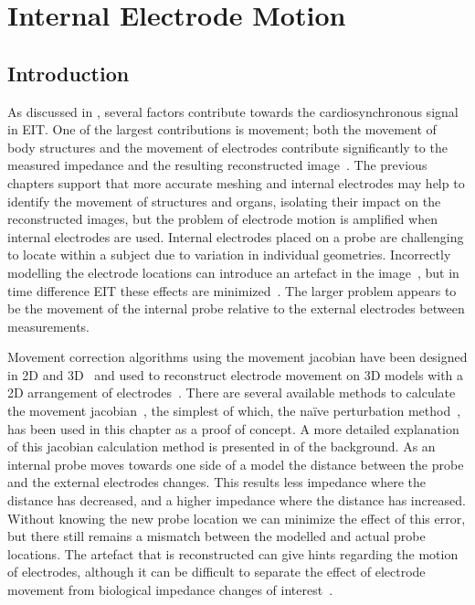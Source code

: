 \chapter{Internal Electrode Motion}
\label{chap:chapter-7}
\section{Introduction}
As discussed in , several factors contribute towards
the cardiosynchronous signal in EIT. One of the largest contributions 
is movement; both the movement of 
body structures and the movement of electrodes contribute significantly to the measured
impedance and the resulting reconstructed 
image~\parencite{adler_origins_2017,proenca_influence_2015}.
The previous chapters support that more accurate meshing and internal electrodes may
help to identify the movement of structures and organs, isolating their impact on the 
reconstructed images, but the problem of electrode motion is amplified when internal
electrodes are used. 
Internal electrodes placed on a probe are challenging to locate within a subject
due to variation in individual geometries. Incorrectly modelling the electrode 
locations can introduce an artefact in the image~\parencite{boyle_impact_2011}, 
but in time difference EIT these effects are minimized~\parencite{adler_electrical_2017}. 
The larger problem appears 
to be the 
movement of the internal probe relative to the external electrodes between
measurements.

Movement correction algorithms using the movement jacobian have been 
designed in 2D 
and 3D~\parencite{gomez-laberge_direct_2007,soleimani_imaging_2006,gomez-laberge_direct_2008}
and used to reconstruct electrode movement on 3D models with a 2D arrangement 
of electrodes~\parencite{boyle_geophysical_2016}. 
There are several available methods to calculate the movement 
jacobian~\parencite{boyle_methods_2017}, the simplest of which,
the na\"{i}ve perturbation method~\parencite{gomez-laberge_direct_2008},
has been used in this chapter as a proof of concept.  
A more detailed explanation of this jacobian calculation method is presented in 
 of the background.
As an internal probe moves towards one side of a model the distance between the 
probe and the external electrodes changes. This results less impedance where the distance 
has decreased, and a higher impedance where the distance has increased. Without knowing 
the new probe location we can minimize the effect of this error, but there still remains 
a mismatch between the modelled and actual probe locations. 
The artefact that is reconstructed can give hints regarding the motion of electrodes,
although it can be difficult to separate the effect of electrode movement 
from biological impedance changes of interest~\parencite{boyle_geophysical_2016}. 

